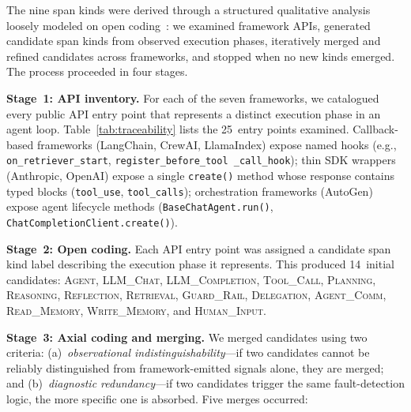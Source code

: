 \documentclass[sigplan,10pt,screen]{acmart}
\begin{document}
The nine span kinds were derived through a structured qualitative
analysis loosely modeled on open coding~\cite{strauss_corbin}: we
examined framework APIs, generated candidate span kinds from observed
execution phases, iteratively merged and refined candidates across
frameworks, and stopped when no new kinds emerged.  The process
proceeded in four stages.

\textbf{Stage~1: API inventory.}  For each of the seven frameworks, we
catalogued every public API entry point that represents a distinct
execution phase in an agent loop.  Table~\ref{tab:traceability} lists
the 25~entry points examined.  Callback-based frameworks (LangChain,
CrewAI, LlamaIndex) expose named hooks
(e.g., \texttt{on\_retriever\_start}, \texttt{register\_before\_tool%
\_call\_hook}); thin SDK wrappers (Anthropic, OpenAI) expose a single
\texttt{create()} method whose response contains typed blocks
(\texttt{tool\_use}, \texttt{tool\_calls}); orchestration frameworks
(AutoGen) expose agent lifecycle methods (\texttt{BaseChatAgent.run()},
\texttt{ChatCompletionClient.create()}).

\textbf{Stage~2: Open coding.}  Each API entry point was assigned a
candidate span kind label describing the execution phase it represents.
This produced 14~initial candidates: \textsc{Agent}, \textsc{LLM\_Chat},
\textsc{LLM\_Completion}, \textsc{Tool\_Call}, \textsc{Planning},
\textsc{Reasoning}, \textsc{Reflection}, \textsc{Retrieval},
\textsc{Guard\_Rail}, \textsc{Delegation}, \textsc{Agent\_Comm},
\textsc{Read\_Memory}, \textsc{Write\_Memory}, and
\textsc{Human\_Input}.

\textbf{Stage~3: Axial coding and merging.}  We merged candidates using
two criteria: (a)~\emph{observational indistinguishability}---if two
candidates cannot be reliably distinguished from framework-emitted
signals alone, they are merged; and (b)~\emph{diagnostic
redundancy}---if two candidates trigger the same fault-detection logic,
the more specific one is absorbed.  Five merges occurred:
\end{document}
